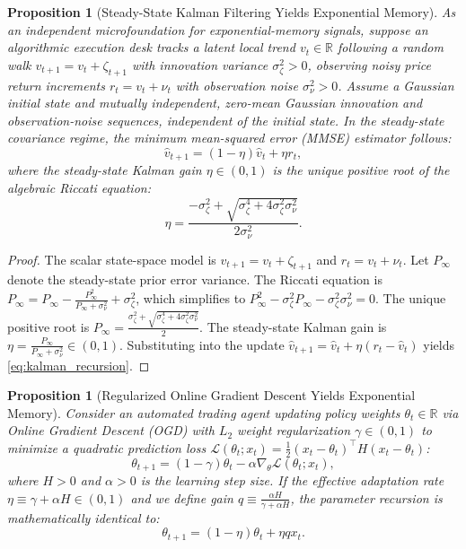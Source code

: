 \documentclass[12pt]{article}
\newtheorem{proposition}[theorem]{Proposition}
\theoremstyle{definition}
\theoremstyle{remark}
\newcommand{\R}{\mathbb{R}}
\begin{document}
\begin{proposition}[Steady-State Kalman Filtering Yields Exponential Memory]
\label{prop:kalman}
As an independent microfoundation for exponential-memory signals, suppose an algorithmic execution desk tracks a latent local trend $v_t \in \R$ following a random walk $v_{t+1} = v_t + \zeta_{t+1}$ with innovation variance $\sigma_\zeta^2 > 0$, observing noisy price return increments $r_t = v_t + \nu_t$ with observation noise $\sigma_\nu^2 > 0$. Assume a Gaussian initial state and mutually independent, zero-mean Gaussian innovation and observation-noise sequences, independent of the initial state. In the steady-state covariance regime, the minimum mean-squared error (MMSE) estimator follows:
\begin{equation}
\hat{v}_{t+1} = (1 - \eta) \hat{v}_t + \eta r_t,
\label{eq:kalman_recursion}
\end{equation}
where the steady-state Kalman gain $\eta \in (0, 1)$ is the unique positive root of the algebraic Riccati equation:
\begin{equation}
\eta = \frac{-\sigma_\zeta^2 + \sqrt{\sigma_\zeta^4 + 4 \sigma_\zeta^2 \sigma_\nu^2}}{2 \sigma_\nu^2}.
\end{equation}
\end{proposition}

\begin{proof}
The scalar state-space model is $v_{t+1} = v_t + \zeta_{t+1}$ and $r_t = v_t + \nu_t$. Let $P_{\infty}$ denote the steady-state prior error variance. The Riccati equation is $P_\infty = P_\infty - \frac{P_\infty^2}{P_\infty + \sigma_\nu^2} + \sigma_\zeta^2$, which simplifies to $P_\infty^2 - \sigma_\zeta^2 P_\infty - \sigma_\zeta^2 \sigma_\nu^2 = 0$. The unique positive root is $P_\infty = \frac{\sigma_\zeta^2 + \sqrt{\sigma_\zeta^4 + 4\sigma_\zeta^2 \sigma_\nu^2}}{2}$. The steady-state Kalman gain is $\eta = \frac{P_\infty}{P_\infty + \sigma_\nu^2} \in (0, 1)$. Substituting into the update $\hat{v}_{t+1} = \hat{v}_t + \eta (r_t - \hat{v}_t)$ yields \eqref{eq:kalman_recursion}.
\end{proof}

\begin{proposition}[Regularized Online Gradient Descent Yields Exponential Memory]
\label{prop:ogd}
Consider an automated trading agent updating policy weights $\theta_t \in \R$ via Online Gradient Descent (OGD) with $L_2$ weight regularization $\gamma \in (0, 1)$ to minimize a quadratic prediction loss $\mathcal{L}(\theta_t; x_t) = \frac{1}{2} (x_t - \theta_t)^\top H (x_t - \theta_t)$:
\begin{equation}
\theta_{t+1} = (1 - \gamma) \theta_t - \alpha \nabla_\theta \mathcal{L}(\theta_t; x_t),
\end{equation}
where $H>0$ and $\alpha > 0$ is the learning step size. If the effective adaptation rate $\eta \equiv \gamma + \alpha H \in (0, 1)$ and we define gain $q \equiv \frac{\alpha H}{\gamma + \alpha H}$, the parameter recursion is mathematically identical to:
\begin{equation}
\theta_{t+1} = (1 - \eta) \theta_t + \eta q x_t.
\end{equation}
\end{proposition}
\end{document}
